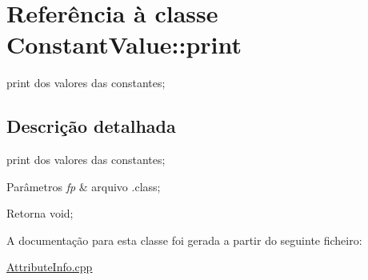 \hypertarget{class_constant_value_1_1print}{}\section{Referência à classe Constant\+Value\+:\+:print}
\label{class_constant_value_1_1print}


print dos valores das constantes;  




\subsection{Descrição detalhada}
print dos valores das constantes; 


\begin{DoxyParams}{Parâmetros}
{\em fp} & arquivo .class; \\
\hline
\end{DoxyParams}
\begin{DoxyReturn}{Retorna}
void; 
\end{DoxyReturn}


A documentação para esta classe foi gerada a partir do seguinte ficheiro\+:\begin{DoxyCompactItemize}
\item 
\hyperlink{_attribute_info_8cpp}{Attribute\+Info.\+cpp}\end{DoxyCompactItemize}
